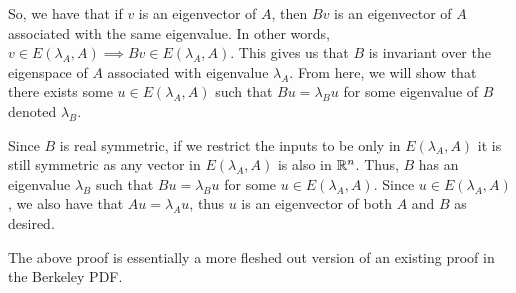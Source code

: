 \documentclass[answers]{exam}
\begin{document}
\begin{questions}
\begin{solution}
        So, we have that if $v$ is an eigenvector of $A$, then $Bv$ is an eigenvector of $A$ associated with the
        same eigenvalue. In other words, $v\in E(\lambda_A,A)\implies Bv\in E(\lambda_A,A)$. This gives us that
        $B$ is invariant over the eigenspace of $A$ associated with eigenvalue $\lambda_A$. From here, we will show
        that there exists some $u\in E(\lambda_A,A)$ such that $Bu = \lambda_Bu$ for some eigenvalue of $B$ 
        denoted $\lambda_B$.

        Since $B$ is real symmetric, if we restrict the inputs to be only in $E(\lambda_A,A)$ it is still symmetric
        as any vector in $E(\lambda_A,A)$ is also in $\mathbb{R}^n$. Thus, $B$ has an eigenvalue $\lambda_B$ such that
        $Bu = \lambda_Bu$ for some $u\in E(\lambda_A,A)$. Since $u\in E(\lambda_A, A)$, we also have that 
        $Au = \lambda_Au$, thus $u$ is an eigenvector of both $A$ and $B$ as desired.

         The above proof is essentially a more fleshed out version of an existing proof in the
        Berkeley PDF.
    \end{solution}
\end{questions}
\end{document}
